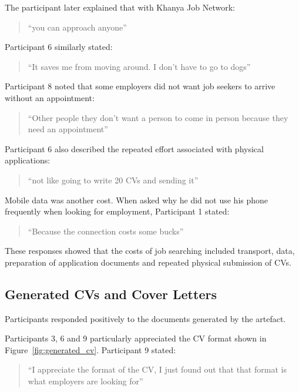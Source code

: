The participant later explained that with Khanya Job Network:

\begin{quote}
``you can approach anyone''
\end{quote}

Participant 6 similarly stated:

\begin{quote}
``It saves me from moving around. I don't have to go to dogs''
\end{quote}

Participant 8 noted that some employers did not want job seekers to arrive without an appointment:

\begin{quote}
``Other people they don't want a person to come in person because they need an appointment''
\end{quote}

Participant 6 also described the repeated effort associated with physical applications:

\begin{quote}
``not like going to write 20 CVs and sending it''
\end{quote}

Mobile data was another cost. When asked why he did not use his phone frequently when looking for employment, Participant 1 stated:

\begin{quote}
``Because the connection costs some bucks''
\end{quote}

These responses showed that the costs of job searching included transport, data, preparation of application documents and repeated physical submission of CVs.


\subsection{Generated CVs and Cover Letters}

Participants responded positively to the documents generated by the artefact.

Participants 3, 6 and 9 particularly appreciated the CV format shown in Figure~\ref{fig:generated_cv}. Participant 9 stated:

\begin{quote}
``I appreciate the format of the CV, I just found out that that format is what employers are looking for''
\end{quote}

